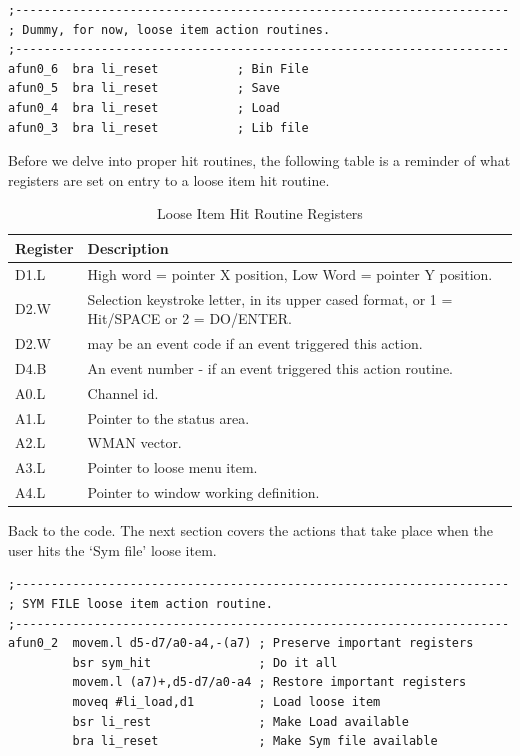 \begin{lstlisting}[firstnumber=last,caption={LibGen\_asm - Dummy Action Routines}]
;---------------------------------------------------------------------
; Dummy, for now, loose item action routines.
;---------------------------------------------------------------------
afun0_6  bra li_reset           ; Bin File
afun0_5  bra li_reset           ; Save
afun0_4  bra li_reset           ; Load
afun0_3  bra li_reset           ; Lib file
\end{lstlisting}

Before we delve into proper hit routines, the following table is a
    reminder of what registers are set on entry to a loose item hit
    routine.


\begin{table}[htbp]
\centering
\begin{tabular}{l p{}}
\toprule
\textbf{Register} &\textbf{Description}  \\
\midrule
%
D1.L & High word = pointer X position, Low Word = pointer Y position.\\
D2.W & Selection keystroke letter, in its upper cased format, or 1 = Hit/SPACE or 2 = DO/ENTER.\\ D2.W & may be an event code if an event triggered this action.\\
D4.B & An event number - if an event triggered this action routine.\\
A0.L & Channel id.\\
A1.L & Pointer to the status area.\\
A2.L & WMAN vector.\\
A3.L & Pointer to loose menu item.\\
A4.L & Pointer to window working definition.\\
%
\bottomrule
\end{tabular}
\caption{Loose Item Hit Routine Registers}
\label{tab:LooseItemHitRoutineRegisters}
\end{table}

Back to the code. The next section covers the actions that take
    place when the user hits the `Sym file' loose item.

\begin{lstlisting}[firstnumber=last,caption={LibGen\_asm - SymFile Action Routine}]
;---------------------------------------------------------------------
; SYM FILE loose item action routine.
;---------------------------------------------------------------------
afun0_2  movem.l d5-d7/a0-a4,-(a7) ; Preserve important registers
         bsr sym_hit               ; Do it all
         movem.l (a7)+,d5-d7/a0-a4 ; Restore important registers
         moveq #li_load,d1         ; Load loose item
         bsr li_rest               ; Make Load available
         bra li_reset              ; Make Sym file available
\end{lstlisting}

